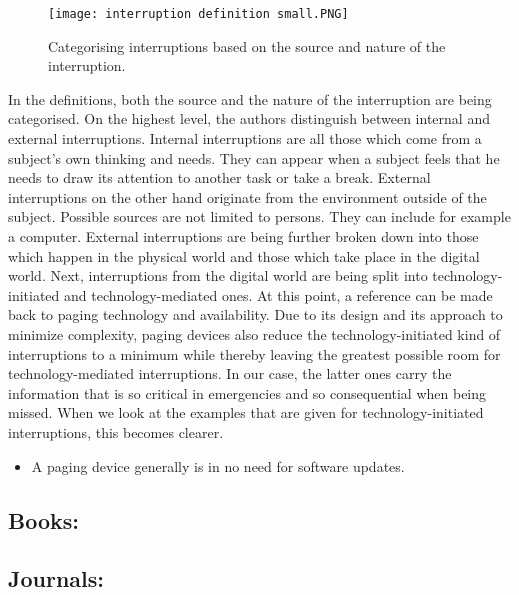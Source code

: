 \documentclass{CML_Seminar_Template}
\begin{document}
\begin{figure}[htb]
  \begin{center}
   \texttt{[image: interruption definition small.PNG]}
  \end{center}
    \caption{\label{interruptions_fig}  Categorising interruptions based on the source and nature of the interruption. \cite[]{Fetter2018}}
\end{figure}

In the definitions, both the source and the nature of the interruption are being categorised. On the highest level, the authors distinguish between internal and external interruptions. Internal interruptions are all those which come from a subject's own thinking and needs. They can appear when a subject feels that he needs to draw its attention to another task or take a break. External interruptions on the other hand originate from the environment outside of the subject. Possible sources are not limited to persons. They can include for example a computer. External interruptions are being further broken down into those which happen in the physical world and those which take place in the digital world. Next, interruptions from the digital world are being split into technology-initiated and technology-mediated ones. At this point, a reference can be made back to paging technology and availability. Due to its design and its approach to minimize complexity, paging devices also reduce the technology-initiated kind of interruptions to a minimum while thereby leaving the greatest possible room for technology-mediated interruptions. In our case, the latter ones carry the information that is so critical in emergencies and so consequential when being missed. When we look at the examples that are given for technology-initiated interruptions, this becomes clearer.
\begin{itemize}
	\item A paging device generally is in no need for software updates. 
\end{itemize}
\subsection*{Books:} 

\cite[]{Ham2002, MaVa1984}

\subsection*{Journals:}
\end{document}
